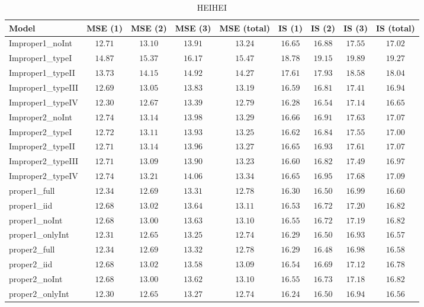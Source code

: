 \begin{table}

\caption{\label{tab:model-choice-sc10}HEIHEI}
\centering
\begin{tabular}{lcccccccc}
\hline
Model  & MSE (1) & MSE (2) & MSE (3) & MSE (total) & IS (1) & IS (2) & IS (3) & \multicolumn{1}{c}{IS (total)} \\ 
\hline
Improper1_noInt  & $12.71$ & $13.10$ & $13.91$ & $13.24$ & $16.65$ & $16.88$ & $17.55$ & $17.02$ \\
Improper1_typeI  & $14.87$ & $15.37$ & $16.17$ & $15.47$ & $18.78$ & $19.15$ & $19.89$ & $19.27$ \\
Improper1_typeII  & $13.73$ & $14.15$ & $14.92$ & $14.27$ & $17.61$ & $17.93$ & $18.58$ & $18.04$ \\
Improper1_typeIII  & $12.69$ & $13.05$ & $13.83$ & $13.19$ & $16.59$ & $16.81$ & $17.41$ & $16.94$ \\
Improper1_typeIV  & $12.30$ & $12.67$ & $13.39$ & $12.79$ & $16.28$ & $16.54$ & $17.14$ & $16.65$ \\
Improper2_noInt  & $12.74$ & $13.14$ & $13.98$ & $13.29$ & $16.66$ & $16.91$ & $17.63$ & $17.07$ \\
Improper2_typeI  & $12.72$ & $13.11$ & $13.93$ & $13.25$ & $16.62$ & $16.84$ & $17.55$ & $17.00$ \\
Improper2_typeII  & $12.71$ & $13.14$ & $13.96$ & $13.27$ & $16.65$ & $16.93$ & $17.61$ & $17.07$ \\
Improper2_typeIII  & $12.71$ & $13.09$ & $13.90$ & $13.23$ & $16.60$ & $16.82$ & $17.49$ & $16.97$ \\
Improper2_typeIV  & $12.74$ & $13.21$ & $14.06$ & $13.34$ & $16.65$ & $16.95$ & $17.68$ & $17.09$ \\
proper1_full  & $12.34$ & $12.69$ & $13.31$ & $12.78$ & $16.30$ & $16.50$ & $16.99$ & $16.60$ \\
proper1_iid  & $12.68$ & $13.02$ & $13.64$ & $13.11$ & $16.53$ & $16.72$ & $17.20$ & $16.82$ \\
proper1_noInt  & $12.68$ & $13.00$ & $13.63$ & $13.10$ & $16.55$ & $16.72$ & $17.19$ & $16.82$ \\
proper1_onlyInt  & $12.31$ & $12.65$ & $13.25$ & $12.74$ & $16.29$ & $16.50$ & $16.93$ & $16.57$ \\
proper2_full  & $12.34$ & $12.69$ & $13.32$ & $12.78$ & $16.29$ & $16.48$ & $16.98$ & $16.58$ \\
proper2_iid  & $12.68$ & $13.02$ & $13.58$ & $13.09$ & $16.54$ & $16.69$ & $17.12$ & $16.78$ \\
proper2_noInt  & $12.68$ & $13.00$ & $13.62$ & $13.10$ & $16.55$ & $16.73$ & $17.18$ & $16.82$ \\
proper2_onlyInt  & $12.30$ & $12.65$ & $13.27$ & $12.74$ & $16.24$ & $16.50$ & $16.94$ & $16.56$ \\
\hline 
\end{tabular}


\end{table}